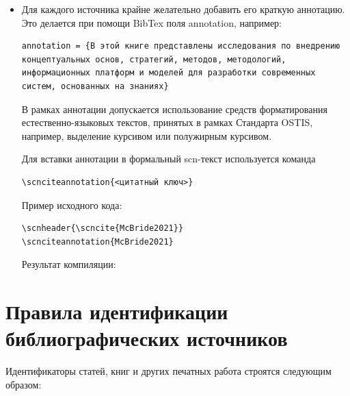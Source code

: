 \begin{itemize}
\item Для каждого источника крайне желательно добавить его краткую аннотацию. Это делается при помощи BibTex поля annotation, например:

\begin{verbatim}
annotation = {В этой книге представлены исследования по внедрению концептуальных основ, стратегий, методов, методологий, информационных платформ и моделей для разработки современных систем, основанных на знаниях}
\end{verbatim}

В рамках аннотации допускается использование средств форматирования естественно-языковых текстов, принятых в рамках Стандарта OSTIS, например, выделение курсивом или полужирным курсивом.

Для вставки аннотации в формальный scn-текст используется команда 

\begin{verbatim}
\scnciteannotation{<цитатный ключ>}
\end{verbatim}

Пример исходного кода:

\begin{verbatim}
\scnheader{\scncite{McBride2021}}
\scnciteannotation{McBride2021}
\end{verbatim}

Результат компиляции:


\end{itemize}

\section*{Правила идентификации библиографических источников}

Идентификаторы статей, книг и других печатных работа строятся следующим образом:


